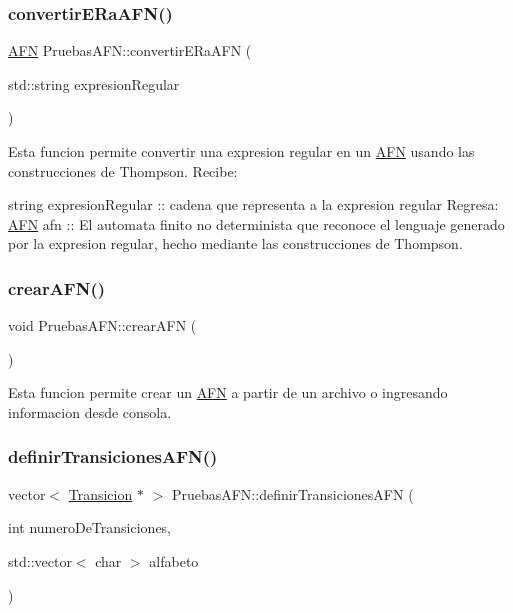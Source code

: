 \subsubsection{\texorpdfstring{convertir\+E\+Ra\+A\+F\+N()}{convertirERaAFN()}}
{\footnotesize\ttfamily \hyperlink{class_a_f_n}{A\+FN} Pruebas\+A\+F\+N\+::convertir\+E\+Ra\+A\+FN (\begin{DoxyParamCaption}\item[{std\+::string}]{expresion\+Regular }\end{DoxyParamCaption})}

Esta funcion permite convertir una expresion regular en un \hyperlink{class_a_f_n}{A\+FN} usando las construcciones de Thompson. Recibe\+:
\begin{DoxyItemize}
\item string expresion\+Regular \+:\+: cadena que representa a la expresion regular Regresa\+: \hyperlink{class_a_f_n}{A\+FN} afn \+:\+: El automata finito no determinista que reconoce el lenguaje generado por la expresion regular, hecho mediante las construcciones de Thompson. 
\end{DoxyItemize}\mbox{\label{class_pruebas_a_f_n_a1df5917c3e8b3f2dc1f83744ad30ffdb}} 
\subsubsection{\texorpdfstring{crear\+A\+F\+N()}{crearAFN()}}
{\footnotesize\ttfamily void Pruebas\+A\+F\+N\+::crear\+A\+FN (\begin{DoxyParamCaption}{ }\end{DoxyParamCaption})}

Esta funcion permite crear un \hyperlink{class_a_f_n}{A\+FN} a partir de un archivo o ingresando informacion desde consola. \mbox{\label{class_pruebas_a_f_n_ab895e1c3ac049325060b898084a22a61}} 
\subsubsection{\texorpdfstring{definir\+Transiciones\+A\+F\+N()}{definirTransicionesAFN()}}
{\footnotesize\ttfamily vector$<$ \hyperlink{class_transicion}{Transicion} $\ast$ $>$ Pruebas\+A\+F\+N\+::definir\+Transiciones\+A\+FN (\begin{DoxyParamCaption}\item[{int}]{numero\+De\+Transiciones,  }\item[{std\+::vector$<$ char $>$}]{alfabeto }\end{DoxyParamCaption})}

